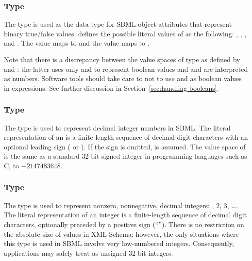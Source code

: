 \subsubsection{Type }
\label{sec:boolean}

The \xmlschemaone type  is used as the data type
for SBML object attributes that represent binary true/false values.
\xmlschemaone defines the possible literal values of
 as the following: , ,
, and .  The value  maps to  and
the value  maps to .

Note that there is a discrepancy between the value spaces of type
 as defined by \xmlschemaone and \mathml: the
latter uses only  and  to represent boolean
values and  and  are interpreted as numbers.
Software tools should take care to not to use  and 
as boolean values in \mathml expressions.  See further discussion
in Section~\ref{sec:handling-booleans}.


\subsubsection{Type }
\label{sec:integer}

The \xmlschemaone type  is used to represent decimal
integer numbers in SBML.  The literal representation of an
 is a finite-length sequence of decimal digit
characters with an optional leading sign (\val{+} or \val{-}).  If
the sign is omitted, \val{+} is assumed.  The value space of
 is the same as a standard 32-bit signed integer in
programming languages such as C,  to $-2147483648$.


\subsubsection{Type }
\label{sec:positiveinteger}

The \xmlschemaone type  is used to
represent nonzero, nonnegative, decimal integers: , 2, 3,
\ldots.  The literal representation of an integer is a
finite-length sequence of decimal digit characters, optionally
preceded by a positive sign (``\token{+}'').  There is no
restriction on the absolute size of 
values in XML Schema; however, the only situations where this type
is used in SBML involve very low-numbered integers.  Consequently,
applications may safely treat  as
unsigned 32-bit integers.


